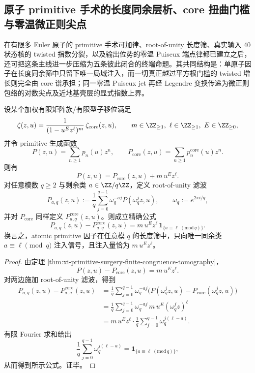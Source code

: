 \subsection{原子 primitive 手术的长度同余层析、core 扭曲门槛与零温微正则尖点}\label{subsec:conclusion-atomic-surgery-congruence-core-logcusp}
在有限多 Euler 原子的 primitive 手术可加律、root-of-unity 长度筛、真实输入 \(40\) 状态核的 twisted 指数分裂，以及输出位势的零温 Puiseux 端点律都已建立之后，还可把这条主线进一步压缩为五条彼此闭合的终端命题。其共同结构是：单原子因子在长度同余筛中只留下唯一局域注入，而一切真正越过平方根门槛的 twisted 增长则完全由 core 谱承担；同一零温 Puiseux jet 再经 Legendre 变换传递为微正则包络的对数尖点及近地基壳层的显式指数上界。

\begin{theorem}\label{thm:conclusion-atomic-surgery-single-congruence-injection}
设某个加权有限矩阵族/有限型子移位满足
\[
\zeta(z,u)=\frac{1}{(1-u^E z^\ell)^m}\,\zeta_{\mathrm{core}}(z,u),
\qquad
m\in\ZZ_{\ge 1},\ \ell\in\ZZ_{\ge 1},\ E\in\ZZ_{\ge 0},
\]
并令 primitive 生成函数
\[
P(z,u)=\sum_{n\ge 1}p_n(u)z^n,
\qquad
P_{\mathrm{core}}(z,u)=\sum_{n\ge 1}p_n^{\mathrm{core}}(u)z^n.
\]
则有
\[
P(z,u)=P_{\mathrm{core}}(z,u)+m\,u^Ez^\ell.
\]
对任意模数 \(q\ge 2\) 与剩余类 \(a\in\ZZ/q\ZZ\)，定义 root-of-unity 滤波
\[
P_{a,q}(z,u):=\frac1q\sum_{j=0}^{q-1}\omega_q^{-aj}P(\omega_q^j z,u),
\qquad
\omega_q:=e^{2\pi i/q},
\]
并对 \(P_{\mathrm{core}}\) 同样定义 \(P_{a,q}^{\mathrm{core}}(z,u)\)。则成立精确公式
\[
\boxed{\;
P_{a,q}(z,u)-P_{a,q}^{\mathrm{core}}(z,u)
=
m\,u^Ez^\ell\,
\mathbf 1_{\{a\equiv \ell\;(\mathrm{mod}\,q)\}}.\;}
\]
换言之，atomic primitive 因子在任意模 \(q\) 的长度筛中，只向唯一同余类 \(a\equiv \ell\pmod q\) 注入信号，且注入量恰为 \(m\,u^Ez^\ell\)。
\end{theorem}
\begin{proof}
由定理 \ref{thm:xi-primitive-surgery-finite-congruence-tomography}，
\[
P(z,u)-P_{\mathrm{core}}(z,u)=m\,u^Ez^\ell.
\]
对两边施加 root-of-unity 滤波，得到
\[
\begin{aligned}
P_{a,q}(z,u)-P_{a,q}^{\mathrm{core}}(z,u)
&=
\frac1q\sum_{j=0}^{q-1}\omega_q^{-aj}
\bigl(P(\omega_q^j z,u)-P_{\mathrm{core}}(\omega_q^j z,u)\bigr)\\
&=
\frac1q\sum_{j=0}^{q-1}\omega_q^{-aj}\,m\,u^E(\omega_q^j z)^\ell\\
&=
m\,u^Ez^\ell\cdot\frac1q\sum_{j=0}^{q-1}\omega_q^{j(\ell-a)}.
\end{aligned}
\]
有限 Fourier 求和给出
\[
\frac1q\sum_{j=0}^{q-1}\omega_q^{j(\ell-a)}
=
\mathbf 1_{\{a\equiv \ell\;(\mathrm{mod}\,q)\}},
\]
从而得到所示公式。证毕。
\end{proof}

